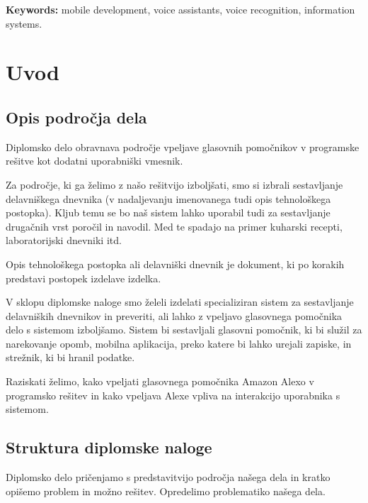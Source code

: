 \documentclass[a4paper, 12pt]{book}
\newcommand{\tkeywordsEn}{mobile development, voice assistants, voice recognition, information systems}
\newcommand{\clearemptydoublepage}{\newpage{\pagestyle{empty}\cleardoublepage}}
\begin{document}
\bigskip

\noindent\textbf{Keywords:} \tkeywordsEn.
\clearemptydoublepage

\mainmatter
\setcounter{page}{1}
\pagestyle{fancy}

\chapter{Uvod}
\section{Opis področja dela}

Diplomsko delo obravnava področje vpeljave glasovnih pomočnikov v programske rešitve kot dodatni uporabniški vmesnik.

Za področje, ki ga želimo z našo rešitvijo  izboljšati, smo si izbrali sestavljanje delavniškega dnevnika (v nadaljevanju imenovanega tudi opis tehnološkega postopka).
Kljub temu se bo naš sistem lahko uporabil tudi za sestavljanje drugačnih vrst poročil in navodil.
Med te spadajo na primer kuharski recepti, laboratorijski dnevniki itd.

Opis tehnološkega postopka ali delavniški dnevnik je dokument, ki po korakih predstavi postopek izdelave izdelka.



V sklopu diplomske naloge smo želeli izdelati specializiran sistem za sestavljanje delavniških dnevnikov in preveriti, ali lahko z vpeljavo glasovnega pomočnika delo s sistemom izboljšamo.
Sistem bi sestavljali glasovni pomočnik, ki bi služil za narekovanje opomb, mobilna aplikacija, preko katere bi lahko urejali zapiske, in strežnik, ki bi hranil podatke.

Raziskati želimo, kako vpeljati glasovnega pomočnika Amazon Alexo v programsko rešitev in kako vpeljava Alexe vpliva na interakcijo uporabnika s sistemom.


\section{Struktura diplomske naloge}

Diplomsko delo pričenjamo s predstavitvijo področja našega dela in kratko opišemo problem in možno rešitev. 
Opredelimo problematiko našega dela.
\end{document}
